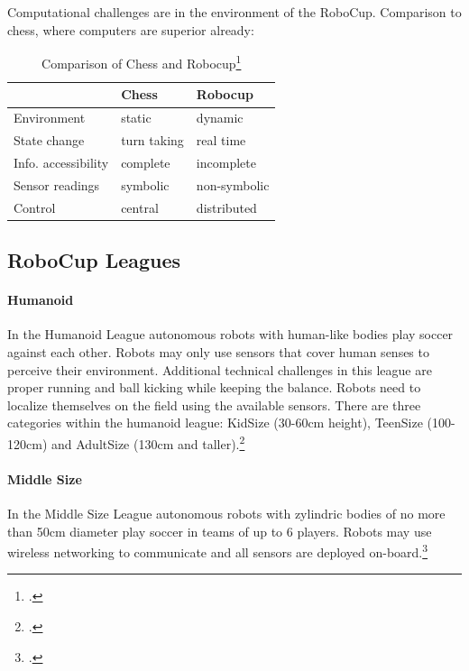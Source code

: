 Computational challenges are in the environment of the RoboCup.
Comparison to chess, where computers are superior already:

\begin{table}[htbp]
\centering
\begin{savenotes}
\begin{tabular*}{0.7\textwidth}{p{} p{} p{}}
\toprule
                    &\textbf{Chess} & \textbf{Robocup} \\
\midrule 
Environment         & static		& dynamic \\
State change        & turn taking   & real time \\
Info. accessibility & complete      & incomplete \\
Sensor readings     & symbolic      & non-symbolic \\
Control             & central       & distributed \\
\bottomrule 
\end{tabular*}
  \caption[Comparison of Chess and Robocup]{Comparison of Chess and Robocup\footcite[][]{robo_objectives}}
  \label{tab:chess_comparison}
\end{savenotes}
\end{table}

\subsection{RoboCup Leagues \label{sec:robo-leagues}}


\paragraph{Humanoid}
In the Humanoid League autonomous robots with human-like bodies play soccer
against each other.
Robots may only use sensors that cover human senses to perceive their
environment. Additional technical challenges in this league are proper running and ball
kicking while keeping the balance. Robots need to localize themselves on the
field using the available sensors.
There are three categories within the humanoid league: KidSize (30-60cm height),
TeenSize (100-120cm) and AdultSize (130cm and taller).\footcite[Cf.][]{robo_humanoid_wiki}
 
\paragraph{Middle Size}
In the Middle Size League autonomous robots with zylindric bodies of no more
than 50cm diameter play soccer in teams of up to 6 players. Robots may use
wireless networking to communicate and all sensors are deployed on-board.\footcite[Cf.][]{robo_ms}
 
